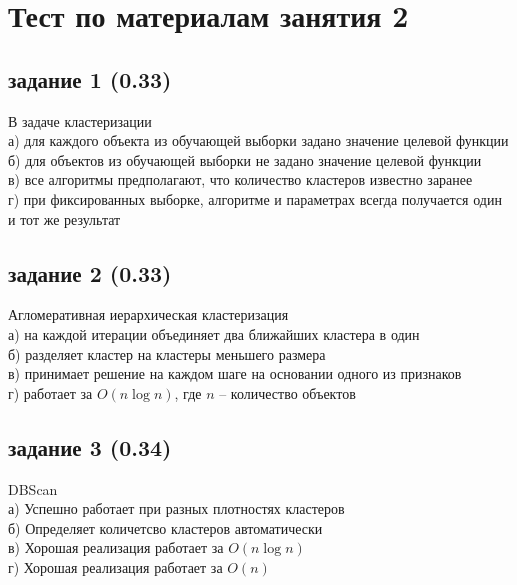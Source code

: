 \documentclass[10pt,a4paper]{article}
\author{Nikolay Anokhin}
\begin{document}
\thispagestyle{empty}

\section*{Тест по материалам занятия 2}

\subsection*{задание 1 (0.33)}

В задаче кластеризации \\
а) для каждого объекта из обучающей выборки задано значение целевой функции  \\
б) для объектов из обучающей выборки не задано значение целевой функции  \\
в) все алгоритмы предполагают, что количество кластеров известно заранее \\
г) при фиксированных выборке, алгоритме и параметрах всегда получается один и тот же результат \\

\subsection*{задание 2 (0.33)}

Агломеративная иерархическая кластеризация \\
а) на каждой итерации объединяет два ближайших кластера в один \\
б) разделяет кластер на кластеры меньшего размера \\
в) принимает решение на каждом шаге на основании одного из признаков \\
г) работает за $O(n \log n)$, где $n$ -- количество объектов

\subsection*{задание 3 (0.34)}

DBScan \\
а) Успешно работает при разных плотностях кластеров \\
б) Определяет количетсво кластеров автоматически \\
в) Хорошая реализация работает за $O(n \log n)$ \\
г) Хорошая реализация работает за $O(n)$

\vspace{5em}
\end{document}
